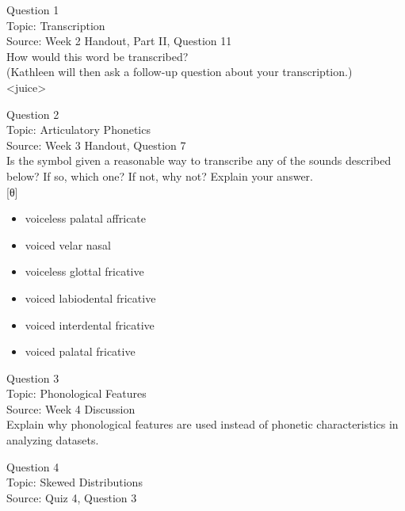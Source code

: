\documentclass[12pt]{article}
\begin{document}
{\large Question 1}\\

Topic: Transcription\\
Source: Week 2 Handout, Part II, Question 11\\

How would this word be transcribed?\\ (Kathleen will then ask a follow-up question about your transcription.)\\

<juice>


\newpage

{\large Question 2}\\

Topic: Articulatory Phonetics\\
Source: Week 3 Handout, Question 7\\

Is the symbol given a reasonable way to transcribe any of the sounds described below? If so, which one? If not, why not? Explain your answer.\\

{[θ]}

\begin{itemize} \item voiceless palatal affricate \item voiced velar nasal \item voiceless glottal fricative \item voiced labiodental fricative \item voiced interdental fricative \item voiced palatal fricative \end{itemize}


\newpage

{\large Question 3}\\

Topic: Phonological Features\\
Source: Week 4 Discussion\\

Explain why phonological features are used instead of phonetic characteristics in analyzing datasets.\\


\newpage

{\large Question 4}\\

Topic: Skewed Distributions\\
Source: Quiz 4, Question 3\\
\end{document}
